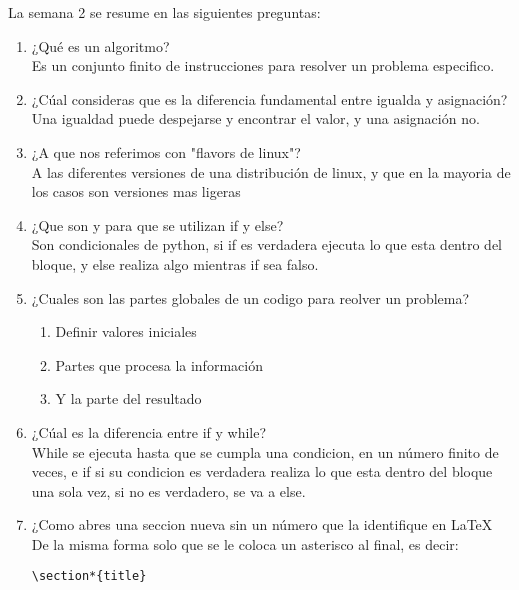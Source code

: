 \documentclass{book}
\begin{document}
La semana 2 se resume en las siguientes preguntas:%
\begin{enumerate}%
	\item ¿Qué es un algoritmo? \\
	Es un conjunto finito de instrucciones para resolver
	un problema especifico.
	
	\item ¿Cúal consideras que es la diferencia fundamental entre igualda y asignación?\\
	Una igualdad puede despejarse y encontrar el valor, y una asignación no.
	\item ¿A que nos referimos con "flavors de linux"?\\
	A las diferentes versiones de una distribución de linux, y que en la mayoria de los casos son versiones mas ligeras
	
	\item ¿Que son y para que se utilizan if y else?\\
	Son condicionales de python, si if es verdadera ejecuta lo que esta dentro del bloque, y else realiza algo mientras if sea falso.
	\item ¿Cuales son las partes globales de un codigo para reolver un problema?
	\begin{enumerate}
		\item Definir valores iniciales
		\item Partes que procesa la información
		\item Y la parte del resultado
	\end{enumerate}
	
	\item ¿Cúal es la diferencia entre if y while?\\
	While se ejecuta hasta que se cumpla una condicion, en un número finito de veces, e if si su condicion es verdadera realiza lo que esta dentro del bloque una sola vez, si no es verdadero, se va a else.
	
	\item ¿Como abres una seccion nueva sin un número que la identifique en \LaTeX\\
	De la misma forma solo que se le coloca un asterisco al final, es decir: \begin{lstlisting}
\section*{title}
	\end{lstlisting}
	

\end{enumerate}
\end{document}
